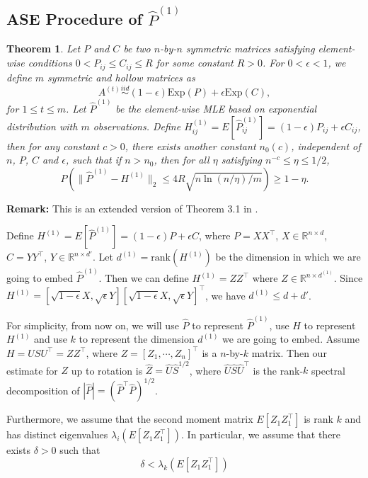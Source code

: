 \documentclass[a4paper]{article}
\newtheorem{theorem}[fact]{Theorem}
\renewcommand{\hat}{\widehat}
\begin{document}
\subsection{ASE Procedure of $\hat{P}^{(1)}$}
\label{section:pf_MLEvsMLEASE1}

\begin{theorem}%
\label{thm:P1Diff}
Let $P$ and $C$ be two $n$-by-$n$ symmetric matrices satisfying element-wise conditions $0 < P_{ij} \le C_{ij} \le R$ for some constant $R > 0$. For $0 < \epsilon < 1$, we define $m$ symmetric and hollow matrices as
\[
	A^{(t)} \stackrel{iid}{\sim} (1-\epsilon) \mathrm{Exp}(P) + \epsilon \mathrm{Exp}(C),
\]
for $1 \le t \le m$.
Let $\hat{P}^{(1)}$ be the element-wise MLE based on exponential distribution with $m$ observations.
Define $H_{ij}^{(1)} = E[\hat{P}_{ij}^{(1)}] = (1-\epsilon) P_{ij} + \epsilon C_{ij}$,
then for any constant $c > 0$, there exists another constant $n_0(c)$, independent of $n$, $P$, $C$ and $\epsilon$, such that if $n > n_0$, then for all $\eta$ satisfying $n^{-c} \le \eta \le 1/2$,
\[
	P \left( \| \hat{P}^{(1)} - H^{(1)} \|_2 \le 4 R \sqrt{n \ln(n/\eta)/m}\right) \ge 1 - \eta.
\]
\end{theorem}
\textbf{Remark:} This is an extended version of Theorem 3.1 in \citep{oliveira2009concentration}. 

Define $H^{(1)} = E[\hat{P}^{(1)}] = (1-\epsilon) P + \epsilon C$, where $P = X X^{\top}$, $X \in \mathbb{R}^{n \times d}$, $C = Y Y^{\top}$, $Y \in \mathbb{R}^{n\times d'}$.
Let $d^{(1)} = \mathrm{rank}(H^{(1)})$ be the dimension in which we are going to embed $\hat{P}^{(1)}$. Then we can define $H^{(1)} = Z Z^{\top}$ where $Z \in \mathbb{R}^{n \times d^{(1)}}$.
Since $H^{(1)} = [\sqrt{1-\epsilon} X, \sqrt{\epsilon} Y] [\sqrt{1-\epsilon} X, \sqrt{\epsilon} Y]^{\top}$, we have $d^{(1)} \le d+d'$.


For simplicity, from now on, we will use $\hat{P}$ to represent $\hat{P}^{(1)}$, use $H$ to represent $H^{(1)}$ and use $k$ to represent the dimension $d^{(1)}$ we are going to embed. Assume $H = U S U^{\top} = Z Z^{\top}$, where $Z = [Z_1, \cdots, Z_n]^{\top}$ is a $n$-by-$k$ matrix. Then our estimate for $Z$ up to rotation is $\hat{Z} = \hat{U} \hat{S}^{1/2}$, where $\hat{U} \hat{S} \hat{U}^{\top}$ is the rank-$k$ spectral decomposition of $|\hat{P}| = (\hat{P}^{\top} \hat{P})^{1/2}$.

Furthermore, we assume that the second moment matrix $E[Z_1 Z_1^{\top}]$ is rank $k$ and has distinct eigenvalues $\lambda_i(E[Z_1 Z_1^{\top}])$. In particular, we assume that there exists $\delta > 0$ such that
\[
	\delta < \lambda_k(E[Z_1 Z_1^{\top}])
\]
\end{document}
